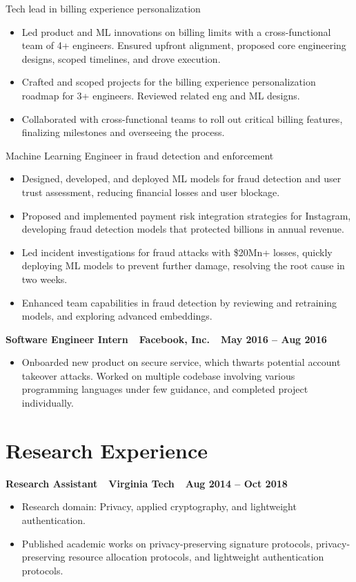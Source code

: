 \documentclass[line,margin]{res}
\begin{document}
\begin{resume}
Tech lead in billing experience personalization
\begin{itemize}\itemsep -2pt
    \item Led product and ML innovations on billing limits with a cross-functional team of 4+ engineers. Ensured upfront alignment, proposed core engineering designs, scoped timelines, and drove execution.
    \item Crafted and scoped projects for the billing experience personalization roadmap for 3+ engineers. Reviewed related eng and ML designs.
    \item Collaborated with cross-functional teams to roll out critical billing features, finalizing milestones and overseeing the process.
\end{itemize}

Machine Learning Engineer in fraud detection and enforcement
\begin{itemize}\itemsep -2pt
  \item Designed, developed, and deployed ML models for fraud detection and user trust assessment, reducing financial losses and user blockage.
  \item Proposed and implemented payment risk integration strategies for Instagram, developing fraud detection models that protected billions in annual revenue.
  \item Led incident investigations for fraud attacks with \$20Mn+ losses, quickly deploying ML models to prevent further damage, resolving the root cause in two weeks.
  \item Enhanced team capabilities in fraud detection by reviewing and retraining models, and exploring advanced embeddings.
\end{itemize}

\textbf{Software Engineer Intern\ \textbar\ Facebook, Inc.\ \textbar\ May 2016 -- Aug 2016}
\begin{itemize}[noitemsep]
\item Onboarded new product on secure service, which thwarts potential account takeover attacks. Worked on multiple codebase involving various programming languages under few guidance, and completed project individually.
\end{itemize}


\section{Research Experience}
\textbf{Research Assistant\ \textbar\ Virginia Tech\ \textbar\ Aug 2014 -- Oct 2018}
\begin{itemize}[noitemsep]
    \item Research domain: Privacy, applied cryptography, and lightweight authentication.
    \item Published academic works on privacy-preserving signature protocols, privacy-preserving resource allocation protocols, and lightweight authentication protocols.
\end{itemize}


\end{resume}
\end{document}
